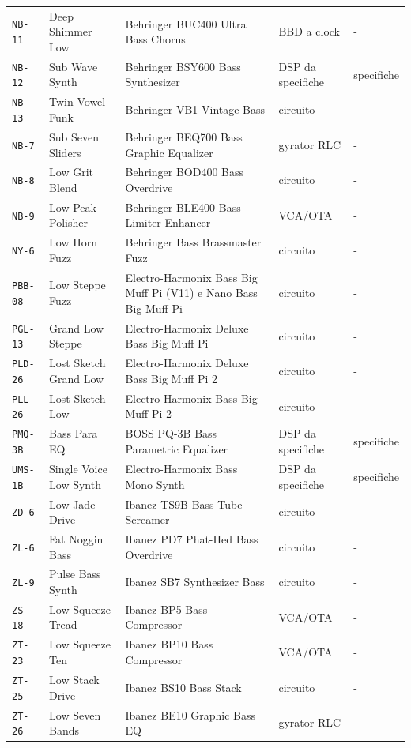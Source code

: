 \begin{xltabular}{\linewidth}{@{}l l X l l@{}}
\texttt{NB-11} & Deep Shimmer Low & Behringer BUC400 Ultra Bass Chorus & BBD a clock & -\\
\texttt{NB-12} & Sub Wave Synth & Behringer BSY600 Bass Synthesizer & DSP da specifiche & specifiche\\
\texttt{NB-13} & Twin Vowel Funk & Behringer VB1 Vintage Bass & circuito & -\\
\texttt{NB-7} & Sub Seven Sliders & Behringer BEQ700 Bass Graphic Equalizer & gyrator RLC & -\\
\texttt{NB-8} & Low Grit Blend & Behringer BOD400 Bass Overdrive & circuito & -\\
\texttt{NB-9} & Low Peak Polisher & Behringer BLE400 Bass Limiter Enhancer & VCA/OTA & -\\
\texttt{NY-6} & Low Horn Fuzz & Behringer Bass Brassmaster Fuzz & circuito & -\\
\texttt{PBB-08} & Low Steppe Fuzz & Electro-Harmonix Bass Big Muff Pi (V11) e Nano Bass Big Muff Pi & circuito & -\\
\texttt{PGL-13} & Grand Low Steppe & Electro-Harmonix Deluxe Bass Big Muff Pi & circuito & -\\
\texttt{PLD-26} & Lost Sketch Grand Low & Electro-Harmonix Deluxe Bass Big Muff Pi 2 & circuito & -\\
\texttt{PLL-26} & Lost Sketch Low & Electro-Harmonix Bass Big Muff Pi 2 & circuito & -\\
\texttt{PMQ-3B} & Bass Para EQ & BOSS PQ-3B Bass Parametric Equalizer & DSP da specifiche & specifiche\\
\texttt{UMS-1B} & Single Voice Low Synth & Electro-Harmonix Bass Mono Synth & DSP da specifiche & specifiche\\
\texttt{ZD-6} & Low Jade Drive & Ibanez TS9B Bass Tube Screamer & circuito & -\\
\texttt{ZL-6} & Fat Noggin Bass & Ibanez PD7 Phat-Hed Bass Overdrive & circuito & -\\
\texttt{ZL-9} & Pulse Bass Synth & Ibanez SB7 Synthesizer Bass & circuito & -\\
\texttt{ZS-18} & Low Squeeze Tread & Ibanez BP5 Bass Compressor & VCA/OTA & -\\
\texttt{ZT-23} & Low Squeeze Ten & Ibanez BP10 Bass Compressor & VCA/OTA & -\\
\texttt{ZT-25} & Low Stack Drive & Ibanez BS10 Bass Stack & circuito & -\\
\texttt{ZT-26} & Low Seven Bands & Ibanez BE10 Graphic Bass EQ & gyrator RLC & -\\

\end{xltabular}
